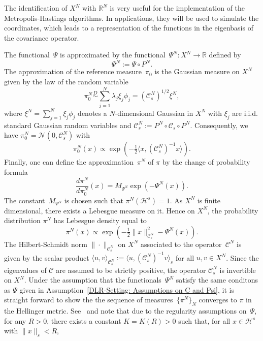 \begin{rem}
 The identification of $X^N$ with $\mathbb{R}^N$ is very useful for the implementation of the Metropolis-Hastings algorithms. In applications, they will be used to simulate the coordinates, which leads to a representation of the functions in the eigenbasis of the covariance operator.
\end{rem}

The functional~$\Psi$ is approximated by the functional~$\Psi^N : X^N \to \mathbb{R}$ defined by
\begin{equation}
\label{DLR-Setting: Definition Psi^N}
 \Psi^N := \Psi \circ P^N.
\end{equation}
The approximation of the reference measure~$\pi_0$ is the Gaussian measure on $X^N$ given by the law of the random variable
\begin{equation*}
 \pi^N_0 \stackrel{D}{\sim} \sum_{j=1}^{N} \lambda_j \xi_j \phi_j = (\mathcal{C}^N_s)^{1/2} \xi^N, 
\end{equation*}
where $\xi^N = \sum_{j=1}^{N} \xi_j \phi_j$ denotes a $N$-dimensional Gaussian in $X^N$ with $\xi_j$ are i.i.d.\,standard Gaussian random variables and  $\mathcal{C}_s^N :=P^N \circ \mathcal{C}_s \circ P^N $. Consequently, we have $\pi_0^N = \mathcal{N}(0, \mathcal{C}_s^N)$ with
\begin{equation*}
 \pi_0^N (x) \varpropto \exp (- \tfrac{1}{2} \langle x, (\mathcal{C}^N_s)^{-1} x \rangle).
\end{equation*}
Finally, one can define the approximation~$\pi^N$ of $\pi$ by the change of probability formula
\begin{equation}
\label{DLR-Setting: Definition of pi^N}
 \frac{d \pi^N}{d \pi_0^N} (x) = M_{\Psi^N} \exp (- \Psi^N (x)).
\end{equation}
The constant~$M_{\Psi^N}$ is chosen such that $\pi^N (\mathcal{H}^s) =1$. As $X^N$ is finite dimensional, there exists a Lebesgue measure on it. Hence on $X^{N}$, the probability distribution $\pi^{N}$ has Lebesgue density equal to
\begin{equation}
\label{DLR-Setting: Definition finite dim target measure pi^N}
 \pi^N (x) \varpropto \exp (-\tfrac{1}{2} \| x \|^2_{\mathcal{C}_s^N} - \Psi^N (x)).
\end{equation}
The Hilbert-Schmidt norm  $ \| \cdot \|_{\mathcal{C}_s^{N}} $ on $X^{N}$ associated to the operator~$\mathcal{C}^N$ is given by the scalar product $ \langle u, v \rangle_{\mathcal{C}_s^{N}} := \langle u, ( \mathcal{C}_s^{N} )^{-1} v \rangle_s $ for all $ u,v \in X^{N} $. Since the eigenvalues of $ \mathcal{C} $ are assumed to be strictly positive, the operator $ \mathcal{C}_s^{N} $ is invertible on $X^{N}$. Under the assumption that the functionals~$\Psi^N$ satisfy the same conditons as $\Psi$ given in Assumption~\ref{DLR-Setting: Assumptions on C and Psi}, it is straight forward to show the the sequence of measures~$\{ \pi^N \}_N$ converges to $\pi$ in the Hellinger metric. See~\autocite[Theorem 2.6]{Cotter2010} and note that due to the regularity assumptions on~$\Psi$, for any $R>0$, there exists a constant $K=K(R)>0$ such that, for all $x\in \mathcal{H}^s$ with $\|x\|_s < R$,
